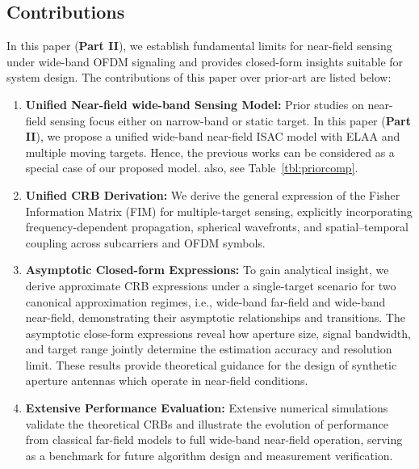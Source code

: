 \documentclass[9pt,final,journal,twocolumn]{IEEEtran}
\begin{document}
\vspace{-0.2cm}
\subsection{Contributions}
\vspace{-0.1cm}
In this paper (\textbf{Part II}), we establish fundamental limits for near-field sensing under wide-band OFDM signaling and provides closed-form insights suitable for system design. The contributions of this paper over prior-art are listed below:  \\
\begin{enumerate}
   \item  \textbf{Unified Near-field wide-band Sensing Model:} Prior studies on near-field sensing focus either on narrow-band or static target. In this paper (\textbf{Part II}), we propose a unified wide-band near-field ISAC model with ELAA and multiple moving targets.  Hence, the previous works \cite{liang2021CramerRao,hu2024joint} can be considered as a special case of our proposed model. also, see Table~\ref{tbl:priorcomp}.
   \item  \textbf{Unified CRB Derivation:} We derive the general expression of the Fisher Information Matrix (FIM) for multiple-target sensing, explicitly incorporating frequency-dependent propagation, spherical wavefronts, and spatial–temporal coupling across subcarriers and OFDM symbols. 
   \item  \textbf{Asymptotic Closed-form Expressions:} To gain analytical insight, we derive approximate CRB expressions under a single-target scenario for two canonical approximation regimes, i.e., wide-band far-field and wide-band near-field, demonstrating their asymptotic relationships and transitions. The asymptotic close-form expressions reveal how aperture size, signal bandwidth, and target range jointly determine the estimation accuracy and resolution limit. These results provide theoretical guidance for the design of synthetic aperture antennas which operate in near-field conditions. 
   \item  \textbf{Extensive Performance Evaluation:} Extensive numerical simulations validate the theoretical CRBs and illustrate the evolution of performance from classical far-field models to full wide-band near-field operation, serving as a benchmark for future algorithm design and measurement verification.
\end{enumerate}



\end{document}
